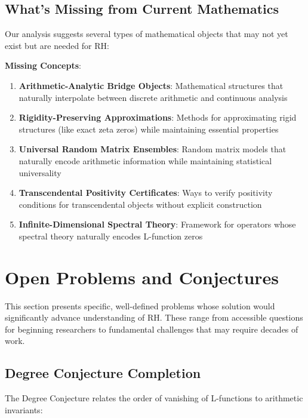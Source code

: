 \subsection{What's Missing from Current Mathematics}
\label{subsec:missing_mathematics}

Our analysis suggests several types of mathematical objects that may not yet exist but are needed for RH:

\noindent\textbf{Missing Concepts}:
\begin{enumerate}
\item \textbf{Arithmetic-Analytic Bridge Objects}: Mathematical structures that naturally interpolate between discrete arithmetic and continuous analysis

\item \textbf{Rigidity-Preserving Approximations}: Methods for approximating rigid structures (like exact zeta zeros) while maintaining essential properties

\item \textbf{Universal Random Matrix Ensembles}: Random matrix models that naturally encode arithmetic information while maintaining statistical universality

\item \textbf{Transcendental Positivity Certificates}: Ways to verify positivity conditions for transcendental objects without explicit construction

\item \textbf{Infinite-Dimensional Spectral Theory}: Framework for operators whose spectral theory naturally encodes L-function zeros
\end{enumerate}

\section{Open Problems and Conjectures}
\label{sec:open_problems}

This section presents specific, well-defined problems whose solution would significantly advance understanding of RH. These range from accessible questions for beginning researchers to fundamental challenges that may require decades of work.

\subsection{Degree Conjecture Completion}
\label{subsec:degree_conjecture}

The Degree Conjecture relates the order of vanishing of L-functions to arithmetic invariants:


